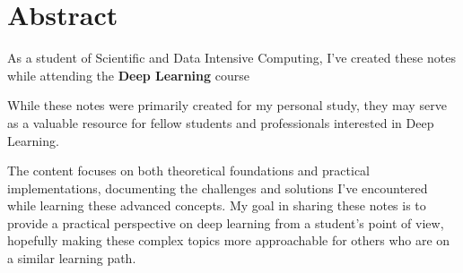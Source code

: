 \chapter*{Abstract}

As a student of Scientific and Data Intensive Computing, I've created these notes while attending the \textbf{Deep Learning} course

While these notes were primarily created for my personal study, they may serve as a valuable resource for fellow students and professionals interested in Deep Learning.

The content focuses on both theoretical foundations and practical implementations, documenting the challenges and solutions I've encountered while learning these advanced concepts. My goal in sharing these notes is to provide a practical perspective on deep learning from a student's point of view, hopefully making these complex topics more approachable for others who are on a similar learning path.